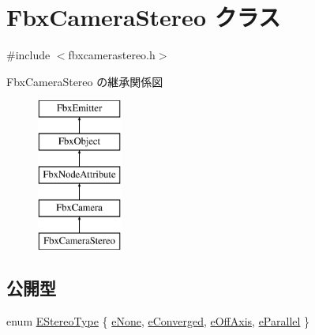 \hypertarget{class_fbx_camera_stereo}{}\section{Fbx\+Camera\+Stereo クラス}
\label{class_fbx_camera_stereo}


{\ttfamily \#include $<$fbxcamerastereo.\+h$>$}

Fbx\+Camera\+Stereo の継承関係図\begin{figure}[H]
\begin{center}
\leavevmode
\includegraphics[height=5.000000cm]{class_fbx_camera_stereo}
\end{center}
\end{figure}
\subsection*{公開型}
\begin{DoxyCompactItemize}
\item 
enum \hyperlink{class_fbx_camera_stereo_acb0f27675a73de0858983b703196cb37}{E\+Stereo\+Type} \{ \hyperlink{class_fbx_camera_stereo_acb0f27675a73de0858983b703196cb37acaf3e8d389472ecc3408aa946d13c31f}{e\+None}, 
\hyperlink{class_fbx_camera_stereo_acb0f27675a73de0858983b703196cb37a37c80e0a3ef659934cac67457a3f8c0c}{e\+Converged}, 
\hyperlink{class_fbx_camera_stereo_acb0f27675a73de0858983b703196cb37a15c8f9c81ecc4a7e7174fe214cfc5ec2}{e\+Off\+Axis}, 
\hyperlink{class_fbx_camera_stereo_acb0f27675a73de0858983b703196cb37a5a361b7a07b8066eaa3ecffa5d695370}{e\+Parallel}
 \}
\end{DoxyCompactItemize}
